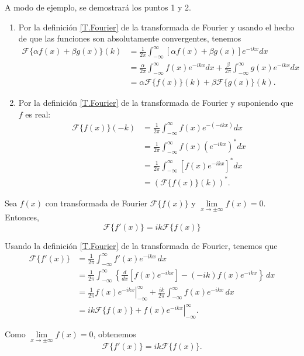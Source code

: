 \begin{demo}
A modo de ejemplo, se demostrará los puntos 1 y 2.
\begin{enumerate}
    \item Por la definición \eqref{T.Fourier} de la transformada de Fourier y usando el hecho de que las funciones son absolutamente convergentes, tenemos
    \begin{align*}
        \mathcal{F}\{\alpha f(x) + \beta g(x)\}(k) &= \frac{1}{2\pi} \int_{-\infty}^{\infty} [\alpha f(x) + \beta g(x)] e^{-ikx} dx \\
        &= \frac{\alpha}{2\pi} \int_{-\infty}^{\infty}  f(x) e^{-ikx} dx + \frac{\beta}{2\pi} \int_{-\infty}^{\infty}  g(x) e^{-ikx} dx \\
        &= \alpha \mathcal{F}\{f(x)\}(k) + \beta \mathcal{F}\{g(x)\}(k).
    \end{align*}
    
    \item Por la definición \eqref{T.Fourier} de la transformada de Fourier y suponiendo que $f$ es real:
    \begin{align*}
        \mathcal{F}\{f(x)\}(-k) &= \frac{1}{2\pi} \int_{-\infty}^{\infty}  f(x)  e^{-(-ikx)} dx  \\
        &= \frac{1}{2\pi} \int_{-\infty}^{\infty}  f(x)  (e^{-ikx})^* dx  \\
        &= \frac{1}{2\pi} \int_{-\infty}^{\infty}  [f(x)  e^{-ikx}]^* dx \\
        &= (\mathcal{F}\{f(x)\}(k))^*.
    \end{align*}
\end{enumerate}
\end{demo}

\begin{propo}
Sea $f(x)$ con transformada de Fourier $\mathcal{F}\{f(x)\}$ y $\lim\limits_{x \to \pm \infty} f(x) = 0$. Entonces, 
$$\boxed{\mathcal{F}\{f'(x)\} = i k \mathcal{F}\{f(x)\}}$$
\end{propo}

\begin{demo}
Usando la definición \eqref{T.Fourier} de la transformada de Fourier, tenemos que 
\begin{align*}
    \mathcal{F}\{f'(x)\} &= \frac{1}{2\pi} \int_{- \infty}^{\infty} f'(x) e^{-ikx} \,dx \\
    &= \frac{1}{2\pi} \int_{- \infty}^{\infty} \left\{ \frac{d}{dx}\left[ f(x) e^{-ikx} \right]  - (-ik) f(x) e^{-ikx} \right\}\,dx \\
    &= \frac{1}{2\pi} \left. f(x) e^{-ikx} \right|_{-\infty}^{\infty} + \frac{ik}{2\pi} \int_{- \infty}^{\infty}  f(x) e^{-ikx} \,dx \\
    &=  ik \mathcal{F}\{f(x)\} + \left. f(x) e^{-ikx} \right|_{-\infty}^{\infty}.
\end{align*}

Como  $\lim\limits_{x \to \pm \infty} f(x) = 0$, obtenemos
$$\mathcal{F}\{f'(x)\} = i k \mathcal{F}\{f(x)\}.$$
\end{demo}

